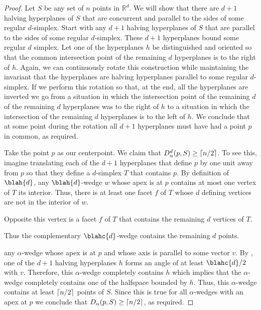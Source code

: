 \documentclass[lotsofwhite]{patmorin}
\begin{document}
\begin{proof}
Let $S$ be any set of $n$ points in $\mathbb{R}^d$.  We will show that
there are $d+1$ halving hyperplanes of $S$ that are concurrent and
parallel to the sides of some regular $d$-simplex.  Start with any
$d+1$ halving hyperplanes of $S$ that are parallel to the sides of
some regular $d$-simplex.  These $d+1$ hyperplanes bound some regular
$d$ simplex. Let one of the hyperplanes $h$ be distinguished and
oriented so that the common intersection point of the remaining $d$
hyperplanes is to the right of $h$.  Again, we can continuously rotate
this construction while maintaining the invariant that the hyperplanes
are halving hyperplanes parallel to some regular $d$-simplex.  If we
perform this rotation so that, at the end, all the hyperplanes are
inverted we go from a situation in which the intersection point of the
remaining $d$ of the remaining $d$ hyperplanes was to the right of $h$
to a situation in which the intersection of the remaining $d$
hyperplanes is to the left of $h$.  We conclude that at some point
during the rotation all $d+1$ hyperplanes must have had a point $p$ in
common, as required.

Take the point $p$ as our centerpoint.  We claim that
$D_\alpha^d(p,S)\ge \left\lceil n/2 \right\rceil$.  To see this, imagine translating
each of the $d+1$ hyperplanes that define $p$ by one unit away from
$p$ so that they define a $d$-simplex $T$ that contains $p$.  By
definition of $\blah{d}$, any $\blah{d}$-wedge $w$ whose apex is at
$p$ contains at most one vertex of $T$ its interior.  Thus, there is
at least one facet $f$ of $T$ whose $d$ defining vertices are not 
in the interior of $w$.

Opposite this vertex
is a facet $f$ of $T$ that contains the remaining $d$ vertices of $T$.


Thus the
complementary $\blahc{d}$-wedge contains the remaining $d$ points.





any
$\alpha$-wedge whose apex is at $p$ and whose axis is parallel to some
vector $v$. By , one of the $d+1$ halving hyperplanes
$h$ forms an angle of at least $\blahc{d}/2$ with $v$.  Therefore,
this $\alpha$-wedge completely contains $h$ which implies that the
$\alpha$-wedge completely contains one of the halfspace bounded by
$h$.  Thus, this $\alpha$-wedge contains at least $\left\lceil n/2 \right\rceil$ points
of $S$.  Since this is true for all $\alpha$-wedges with an apex at
$p$ we conclude that $D_\alpha(p,S)\ge\left\lceil n/2 \right\rceil$, as required.
\end{proof}
\end{document}
